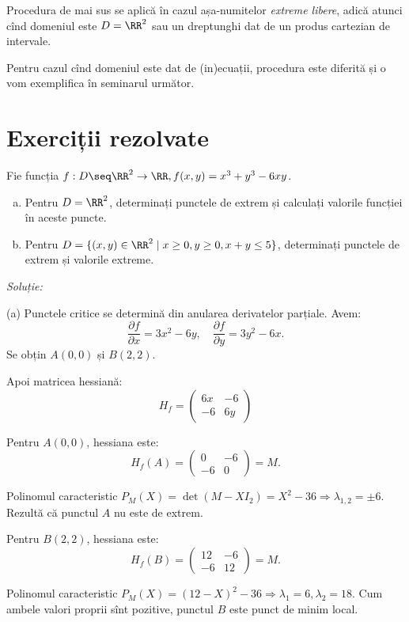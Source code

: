 Procedura de mai sus se aplică în cazul așa-numitelor \emph{extreme libere},
adică atunci cînd domeniul este $ D = \RR^2 $ sau un dreptunghi dat de un
produs cartezian de intervale.

Pentru cazul cînd domeniul este dat de (in)ecuații, procedura este diferită
și o vom exemplifica în seminarul următor.


\section{Exerciții rezolvate}

Fie funcția $ f : D \seq \RR^2 \to \RR, f(x, y) = x^3 + y^3 - 6xy $.
\begin{enumerate}[(a)]
\item Pentru $ D = \RR^2 $, determinați punctele de extrem și calculați
  valorile funcției în aceste puncte.
\item Pentru $ D = \{ (x, y) \in \RR^2 \mid x \geq 0, y \geq 0, x + y \leq 5 \} $,
  determinați punctele de extrem și valorile extreme.
\end{enumerate}

\emph{Soluție:}

(a) Punctele critice se determină din anularea derivatelor parțiale. Avem:
\[
  \frac{\partial f}{\partial x} = 3x^2 - 6y, \quad %
  \frac{\partial f}{\partial y} = 3y^2 - 6x.
\]
Se obțin $ A(0, 0) $ și $ B(2, 2) $.

Apoi matricea hessiană:
\[
  H_f = \begin{pmatrix}
    6x & -6 \\
    -6 & 6y
  \end{pmatrix}
\]

Pentru $ A(0, 0) $, hessiana este:
\[
  H_f(A) = \begin{pmatrix}
    0 & -6 \\
    -6 & 0
  \end{pmatrix} = M.
\]

Polinomul caracteristic $ P_M(X) = \det (M - XI_2) = X^2 - 36 \Rightarrow \lambda_{1,2} = \pm 6 $.
Rezultă că punctul $ A $ nu este de extrem.

Pentru $ B(2, 2) $, hessiana este:
\[
  H_f(B) = \begin{pmatrix}
    12 & -6 \\
    -6 & 12
  \end{pmatrix} = M.
\]

Polinomul caracteristic $ P_M(X) = (12 - X)^2 - 36 \Rightarrow \lambda_1 = 6, \lambda_2 = 18 $.
Cum ambele valori proprii sînt pozitive, punctul $ B $ este punct de minim local.

